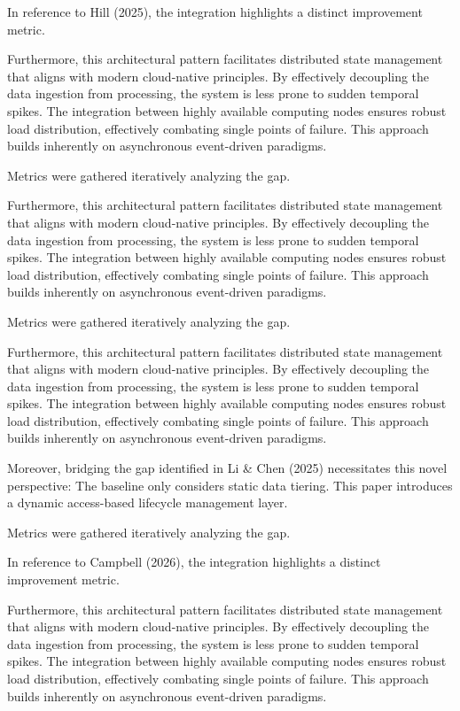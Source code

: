 In reference to Hill (2025), the integration highlights a distinct improvement metric.


Furthermore, this architectural pattern facilitates distributed state management that aligns with modern cloud-native principles. 
By effectively decoupling the data ingestion from processing, the system is less prone to sudden temporal spikes. 
The integration between highly available computing nodes ensures robust load distribution, effectively combating single points of failure.
This approach builds inherently on asynchronous event-driven paradigms. 


Metrics were gathered iteratively analyzing the gap.


Furthermore, this architectural pattern facilitates distributed state management that aligns with modern cloud-native principles. 
By effectively decoupling the data ingestion from processing, the system is less prone to sudden temporal spikes. 
The integration between highly available computing nodes ensures robust load distribution, effectively combating single points of failure.
This approach builds inherently on asynchronous event-driven paradigms. 


Metrics were gathered iteratively analyzing the gap.


Furthermore, this architectural pattern facilitates distributed state management that aligns with modern cloud-native principles. 
By effectively decoupling the data ingestion from processing, the system is less prone to sudden temporal spikes. 
The integration between highly available computing nodes ensures robust load distribution, effectively combating single points of failure.
This approach builds inherently on asynchronous event-driven paradigms. 


Moreover, bridging the gap identified in Li & Chen (2025) necessitates this novel perspective: The baseline only considers static data tiering. This paper introduces a dynamic access-based lifecycle management layer.

Metrics were gathered iteratively analyzing the gap.

In reference to Campbell (2026), the integration highlights a distinct improvement metric.


Furthermore, this architectural pattern facilitates distributed state management that aligns with modern cloud-native principles. 
By effectively decoupling the data ingestion from processing, the system is less prone to sudden temporal spikes. 
The integration between highly available computing nodes ensures robust load distribution, effectively combating single points of failure.
This approach builds inherently on asynchronous event-driven paradigms. 


